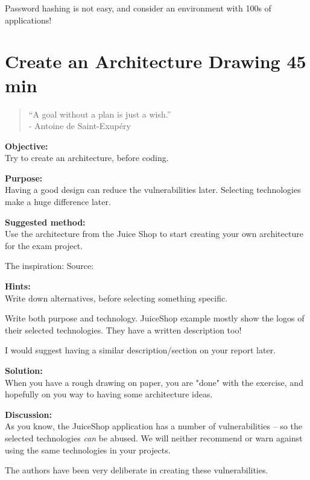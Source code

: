 \documentclass[a4paper,11pt,notitlepage]{report}
\begin{document}
Password hashing is not easy, and consider an environment with 100s of applications!


\chapter{Create an Architecture Drawing 45 min}
\label{ex:architecture-drawing}

\begin{quote}
  “A goal without a plan is just a wish.”\\
  - Antoine de Saint-Exupéry
\end{quote}


{\bf Objective:}\\
Try to create an architecture, before coding.

{\bf Purpose:}\\
Having a good design can reduce the vulnerabilities later. Selecting technologies make a huge difference later.


{\bf Suggested method:}\\
Use the architecture from the Juice Shop to start creating your own architecture for the exam project.

The inspiration:
Source: 

{\bf Hints:}\\
Write down alternatives, before selecting something specific.

Write both purpose and technology. JuiceShop example mostly show the logos of their selected technologies. They have a written description too! 

I would suggest having a similar description/section on your report later.

{\bf Solution:}\\
When you have a rough drawing on paper, you are "done" with the exercise, and hopefully on you way to having some architecture ideas.

{\bf Discussion:}\\
As you know, the JuiceShop application has a number of vulnerabilities -- so the selected technologies \emph{can} be abused. We will neither recommend or warn against using the same technologies in your projects.

The authors have been very deliberate in creating these vulnerabilities.
\end{document}
